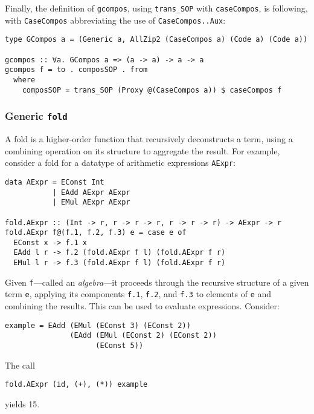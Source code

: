 \documentclass[runningheads]{llncs}
\newcommand{\K}[1]{\lstinline[style=fancy]{#1}}
\begin{document}
Finally, the definition of \K{gcompos}, using \K{trans_SOP} with \K{caseCompos}, is following, with \K{CaseCompos} abbreviating the use of \K{CaseCompos..Aux}:
\begin{lstlisting}[style=fancy]
type GCompos a = (Generic a, AllZip2 (CaseCompos a) (Code a) (Code a))

gcompos :: ∀a. GCompos a => (a -> a) -> a -> a
gcompos f = to . composSOP . from
  where
    composSOP = trans_SOP (Proxy @(CaseCompos a)) $ caseCompos f
\end{lstlisting}

\subsubsection{Generic \K{fold}}

A fold is a higher-order function that recursively deconstructs a term, using a combining operation on its structure to aggregate the result. For example, consider a fold for a datatype of arithmetic expressions \K{AExpr}:
\begin{lstlisting}[style=fancy]
data AExpr = EConst Int
           | EAdd AExpr AExpr
           | EMul AExpr AExpr

fold.AExpr :: (Int -> r, r -> r -> r, r -> r -> r) -> AExpr -> r
fold.AExpr f@(f.1, f.2, f.3) e = case e of
  EConst x -> f.1 x
  EAdd l r -> f.2 (fold.AExpr f l) (fold.AExpr f r)
  EMul l r -> f.3 (fold.AExpr f l) (fold.AExpr f r)
\end{lstlisting}
Given \K{f}---called an \emph{algebra}---it proceeds through the recursive structure of a given term \K{e}, applying its components \K{f.1}, \K{f.2}, and \K{f.3} to elements of \K{e} and combining the results. This can be used to evaluate expressions. Consider:
\begin{lstlisting}[style=fancy]
example = EAdd (EMul (EConst 3) (EConst 2))
               (EAdd (EMul (EConst 2) (EConst 2))
                     (EConst 5))
\end{lstlisting}
The call
\begin{lstlisting}[style=fancy]
fold.AExpr (id, (+), (*)) example
\end{lstlisting}
yields 15.
\end{document}
